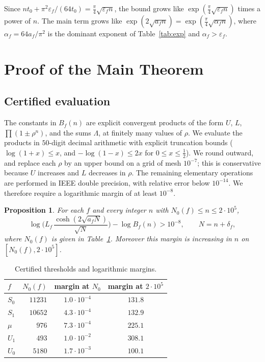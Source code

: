 \documentclass[11pt]{amsart}
\newtheorem{proposition}[theorem]{Proposition}
\theoremstyle{definition}
\theoremstyle{remark}
\numberwithin{equation}{section}
\begin{document}
Since $nt_0+\pi^2\varepsilon_f/(64t_0)=\frac\pi4\sqrt{\varepsilon_fn}$, the bound grows like $\exp(\frac\pi4\sqrt{\varepsilon_fn})$ times a power of $n$.
The main term grows like $\exp(2\sqrt{a_fn})=\exp(\frac\pi4\sqrt{\alpha_fn})$, where $\alpha_f=64a_f/\pi^2$ is the dominant exponent of Table~\ref{tab:exp} and $\alpha_f>\varepsilon_f$.

\section{Proof of the Main Theorem}\label{sec:proof}

\subsection{Certified evaluation}
The constants in $B_f(n)$ are explicit convergent products of the form $U$, $L$, $\prod(1\pm\rho^n)$, and the sums $\Lambda$, at finitely many values of $\rho$.
We evaluate the products in $50$-digit decimal arithmetic with explicit truncation bounds ($\log(1+x)\le x$, and $-\log(1-x)\le2x$ for $0\le x\le\frac12$).
We round outward, and replace each $\rho$ by an upper bound on a grid of mesh $10^{-7}$; this is conservative because $U$ increases and $L$ decreases in $\rho$.
The remaining elementary operations are performed in IEEE double precision, with relative error below $10^{-14}$.
We therefore require a logarithmic margin of at least $10^{-8}$.

\begin{proposition}\label{prop:cert}
For each $f$ and every integer $n$ with $N_0(f)\le n\le 2\cdot10^5$,
\[
\log\Big(L_f\,\frac{\cosh(2\sqrt{a_fN})}{\sqrt N}\Big)-\log B_f(n)>10^{-8},\qquad N=n+\delta_f,
\]
where $N_0(f)$ is given in Table~\ref{tab:N0}.
Moreover this margin is increasing in $n$ on $[N_0(f),2\cdot10^5]$.
\end{proposition}

\begin{table}[ht]
\centering
\renewcommand{\arraystretch}{1.2}
\begin{tabular}{@{}lrcc@{}}
\toprule
$f$ & $N_0(f)$ & margin at $N_0$ & margin at $2\cdot10^5$\\
\midrule
$S_0$ & $11231$ & $1.0\cdot10^{-4}$ & $131.8$\\
$S_1$ & $10652$ & $4.3\cdot10^{-4}$ & $132.9$\\
$\mu$ & $976$ & $7.3\cdot10^{-4}$ & $225.1$\\
$U_1$ & $493$ & $1.0\cdot10^{-2}$ & $308.1$\\
$U_0$ & $5180$ & $1.7\cdot10^{-3}$ & $100.1$\\
\bottomrule
\end{tabular}
\caption{Certified thresholds and logarithmic margins.}\label{tab:N0}
\end{table}
\end{document}
